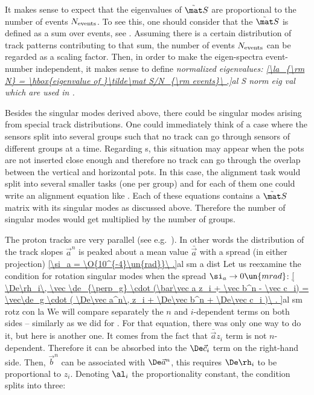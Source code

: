 It makes sense to expect that the eigenvalues of $\tilde\mat S$ are proportional to the number of events $N_{\rm events}$. To see this, one should consider that the $\tilde\mat S$ is defined as a sum over events, see . Assuming there is a certain distribution of track patterns contributing to that sum, the number of events $N_{\rm events}$ can be regarded as a scaling factor. Then, in order to make the eigen-spectra event-number independent, it makes sense to define \em{normalized eigenvalues}:
\eqref{\la_{\rm N} = \hbox{eigenvalue of }\tilde\mat S/N_{\rm events}\ ,}{al S norm eig val}
which are used in .



Besides the singular modes derived above, there could be singular modes arising from special track distributions. One could immediately think of a case where the sensors split into several groups such that no track can go through sensors of different groups at a time. Regarding s, this situation may appear when the pots are not inserted close enough and therefore no track can go through the overlap between the vertical and horizontal pots. In this case, the alignment task would split into several smaller tasks (one per group) and for each of them one could write an alignment equation like . Each of these equations contains a $\tilde\mat S$ matrix with its singular modes as discussed above. Therefore the number of singular modes would get multiplied by the number of groups.

The  proton tracks are very parallel (see e.g.~). In other words the distribution of the track slopes $\vec a^n$ is peaked about a mean value $\bar\vec a$ with a spread (in either projection)
\eqref{\si_a = \O{10^{-4}\un{rad}}\ .}{al sm a dist}
Let us reexamine the condition for rotation singular modes  when the spread $\si_a\to 0\un{mrad}$:
\eqref{
	\De\rh_i\, \vec \de_{\perp_g} \cdot (\bar\vec a z_i + \vec b^n - \vec c_i) =
	\vec\de_g \cdot (
		\De\vec a^n\, z_i +
		\De\vec b^n +
		\De\vec c_i
	)\ .
}{al sm rotz con la}
We will compare separately the $n$ and $i$-dependent terms on both sides -- similarly as we did for . For that equation, there was only one way to do it, but here is another one. It comes from the fact that $\bar\vec a z_i$ term is not $n$-dependent. Therefore it can be absorbed into the $\De\vec c_i$ term on the right-hand side. Then, $\vec b^n$ can be associated with $\De\vec a^n$, this requires $\De\rh_i$ to be proportional to $z_i$. Denoting $\al_i$ the proportionality constant, the condition splits into three:

